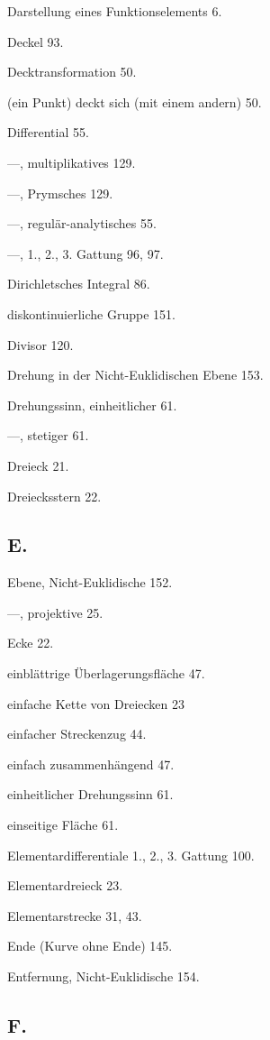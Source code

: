 \documentclass{article}
\begin{document}
Darstellung eines Funktionselements 6.

Deckel 93.

Decktransformation 50.

(ein Punkt) deckt sich (mit einem andern) 50.

Differential 55.

---, multiplikatives 129.

---, Prymsches 129.

---, regulär-analytisches 55.

---, 1., 2., 3. Gattung 96, 97.

Dirichletsches Integral 86.

diskontinuierliche Gruppe 151.

Divisor 120.

Drehung in der Nicht-Euklidischen Ebene 153.

Drehungssinn, einheitlicher 61.

---, stetiger 61.

Dreieck 21.

Dreiecksstern 22.

\subsection*{E.}

Ebene, Nicht-Euklidische 152.

---, projektive 25.

Ecke 22.

einblättrige Überlagerungsfläche 47.

einfache Kette von Dreiecken 23

einfacher Streckenzug 44.

einfach zusammenhängend 47.

einheitlicher Drehungssinn 61.

einseitige Fläche 61.

Elementardifferentiale 1., 2., 3. Gattung 100.

Elementardreieck 23.

Elementarstrecke 31, 43.

Ende (Kurve ohne Ende) 145.

Entfernung, Nicht-Euklidische 154.

\subsection*{F.}
\end{document}
